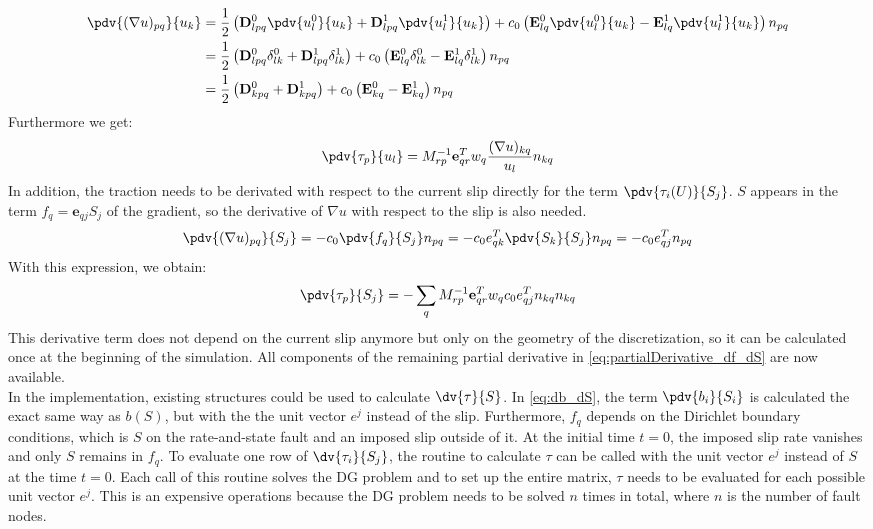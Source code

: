 \begin{align}
\pdv{(\nabla u)_{pq}}{u_k} &= \frac{1}{2}\left(\mathbf{D}_{lpq}^0\pdv{ u_l^0}{u_k} + \mathbf{D}_{lpq}^1\pdv{ u_l^1}{ u_k}\right) + c_0\left(\mathbf{E}_{lq}^0\pdv{u_l^0}{ u_k} - \mathbf{E}_{lq}^1\pdv{ u_l^1}{ u_k}\right)n_{pq} \\
&= \frac{1}{2}\left(\mathbf{D}_{lpq}^0\delta_{lk}^0 + \mathbf{D}_{lpq}^1\delta_{lk}^1\right) + c_0\left(\mathbf{E}_{lq}^0\delta_{lk}^0 - \mathbf{E}_{lq}^1\delta_{lk}^1\right)n_{pq} \\
&= \frac{1}{2}\left(\mathbf{D}_{kpq}^0 + \mathbf{D}_{kpq}^1\right) + c_0\left(\mathbf{E}_{kq}^0 - \mathbf{E}_{kq}^1\right)n_{pq} 
\end{align}
Furthermore we get: 
\begin{equation}
\pdv{ \tau_p}{ u_l} = M_{rp}^{-1}\mathbf{e}_{qr}^Tw_q
\frac{(\nabla u)_{kq}}{ u_l}n_{kq}
\end{equation}
In addition, the traction needs to be derivated with respect to the current slip directly for the term $\pdv{\tau_i(U)}{S_j}$. $S$ appears in the term $f_q = \mathbf{e}_{qj}S_j$ of the gradient, so the derivative of $\nabla u$ with respect to the slip is also needed. 
\begin{align}
\pdv{(\nabla u)_{pq}}{S_j} = -c_0 \pdv{ f_q}{ S_j}n_{pq} 
= -c_0 e^T_{qk}\pdv{ S_k}{ S_j}n_{pq} 
= -c_0 e^T_{qj}n_{pq} 	
\end{align}
With this expression, we obtain: 
\begin{equation}
\label{eq:JacobianDtauDS_Poisson}
\pdv{ \tau_p}{ S_j} = -\sum_q M_{rp}^{-1}\mathbf{e}_{qr}^Tw_qc_0e^T_{qj}n_{kq}n_{kq}
\end{equation}
This derivative term does not depend on the current slip anymore but only on the geometry of the discretization, so it can be calculated once at the beginning of the simulation. All components of the remaining partial derivative in \autoref{eq:partialDerivative_df_dS} are now available. \\
In the implementation, existing structures could be used to calculate $\dv{\tau}{S}$. In \autoref{eq:db_dS}, the term $\pdv{b_i}{S_i}$ is calculated the exact same way as $b(S)$, but with the the unit vector $e^j$ instead of the slip. Furthermore, $f_q$ depends on the Dirichlet boundary conditions, which is $S$ on the rate-and-state fault and an imposed slip outside of it. At the initial time $t=0$, the imposed slip rate vanishes and only $S$ remains in $f_q$. To evaluate one row of $\dv{\tau_i}{S_j}$, the routine to calculate $\tau$ can be called with the unit vector $e^j$ instead of $S$ at the time $t=0$. Each call of this routine solves the DG problem and to set up the entire matrix, $\tau$ needs to be evaluated for each possible unit vector $e^j$. This is an expensive operations because the DG problem needs to be solved $n$ times in total, where $n$ is the number of fault nodes.


